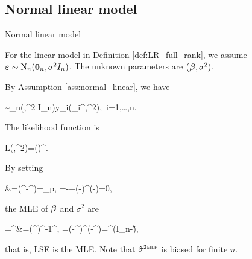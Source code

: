 \documentclass[10pt,a4paper]{book}
\begin{document}
\subsection{Normal linear model}\label{sec:LR_full_rank_normal}
\begin{assbox}{Normal linear model}
	\begin{assumption}\label{ass:normal_linear}
		For the linear model in Definition \ref{def:LR_full_rank}, we assume ${\boldsymbol\varepsilon}\sim\mathrm{N}_n({\boldsymbol 0}_n,\sigma^2 I_n)$. 
		The unknown parameters are $({\boldsymbol\beta},\sigma^2)$.  
	\end{assumption}
\end{assbox}
By Assumption \ref{ass:normal_linear}, we have 
\begin{salign*}
	\Y\sim\rmN_n(\X\bab,\sigma^2 I_n)\qquad \Longleftrightarrow\qquad y_i\simiid \rmN(\x_i^\TT\bab,\sigma^2),\ i=1,\ldots,n.
\end{salign*}
The likelihood function is 
\begin{sequation*}
	L(\bab,\sigma^2)=\left(\right)^{}\exp{}.
\end{sequation*}
By setting
\begin{salign*}
	&=(^\top{}-^\top{}\boldsymbol{\beta})=\0_p, \qquad {}=-+(\Y-\X\bab)^\top(\Y-\X\bab)=0,
\end{salign*}
the MLE of ${\boldsymbol\beta}$ and $\sigma^2$ are 
\begin{salign}\label{eq:LR_full_rank_MLE}
	\hat{\bab}=\hat{\bab}^{\MLE}&=(\X^\TT\X)^{-1}\X^\TT\Y, \qquad {\hat{\sigma}^{2\MLE}}=(\Y-\X\hat{\bab}^{\MLE})^{\TT}(\Y-\X\hat{\bab}^{\MLE})=\Y^{\TT}(I_n-\H)\Y,
\end{salign}  
that is, LSE is the MLE.
Note that ${\hat{\sigma}^{2\textsc{mle}}}$ is biased for finite $n$. 
\end{document}
